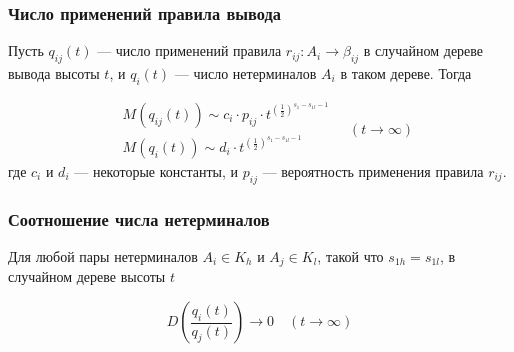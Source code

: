 \documentclass{beamer}
\begin{document}
	
	\begin{frame}
    	\frametitle{Число применений правила вывода}
    	
    	\begin{theorem}
        	Пусть $q_{ij}(t)$ --- число применений правила $r_{ij} : A_i \rightarrow \beta_{ij}$ в случайном дереве вывода высоты $t$, и $q_i(t)$ --- число нетерминалов $A_i$ в таком дереве. Тогда
        	    	
        	\begin{equation*}
            	\begin{aligned}
                	& M(q_{ij}(t)) \sim c_i \cdot p_{ij} \cdot t^{(\frac{1}{2})^{s_1 - s_{1l} - 1}} \\
                	& M(q_i(t)) \sim d_i \cdot t^{(\frac{1}{2})^{s_1 - s_{1l} - 1}}
                \end{aligned} \quad
                (t \rightarrow \infty)
            \end{equation*}
            где $c_i$ и $d_i$ --- некоторые константы, и $p_{ij}$ --- вероятность применения правила $r_{ij}$.
        \end{theorem}
	\end{frame}
	
	\begin{frame}
    	\frametitle{Соотношение числа нетерминалов}
    	
    	\begin{theorem}
            Для любой пары нетерминалов $A_i \in K_h$ и $A_j \in K_l$, такой что $s_{1h} = s_{1l}$, в случайном дереве высоты $t$
    	
        	\begin{equation*}
            	D(\frac{q_i(t)}{q_j(t)}) \rightarrow 0 \quad (t \rightarrow \infty)
        	\end{equation*}

    	\end{theorem}
	\end{frame}
	
\end{document}
